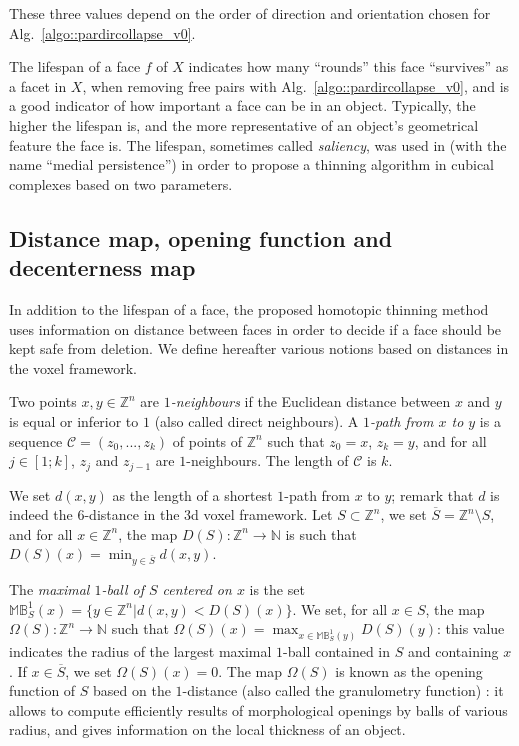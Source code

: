 \documentclass[final,envcountsame]{llncs}
\def\OneBall#1{\mathbb{B}^{1}_{#1}}
\def\MaxOneBall#1{\mathbb{M}\OneBall{#1}}
\def\mydist1{D}
\def\mydd1{\Omega}
\def\dist1{d}
\def\Dist1#1{\mydist1(#1)}
\def\DD1#1{\mydd1(#1)}
\def\myem#1{{\em #1}}
\def\quotes#1{``#1''}
\def\Nset{\mathbb{N}}
\def\Zset{\Z}
\def\Nset{\mathbb{N}}
\def\Z{\mathbb{Z}}
\newcommand{\Compl}[1]{\overline{#1}}
\begin{document}
These three values depend on the order of direction and orientation chosen for Alg.~\ref{algo::pardircollapse_v0}.

The lifespan of a face $f$ of $X$ indicates how many \quotes{rounds} this face \quotes{survives} as a facet in $X$, when removing free pairs with Alg.~\ref{algo::pardircollapse_v0}, and is a good indicator of how important a face can be in an object. Typically, the higher the lifespan is, and the more representative of an object's geometrical feature the face is. The lifespan, sometimes called \myem{saliency}, was used in \cite{Liu2009} (with the name \quotes{medial persistence}) in order to propose a thinning algorithm in cubical complexes based on two parameters.



\subsection{Distance map, opening function and decenterness map}
\label{subsec::distmap}
In addition to the lifespan of a face, the proposed homotopic thinning method uses information on distance between faces in order to decide if a face should be kept safe from deletion. We define hereafter various notions based on distances in the voxel framework.

Two points $x,y \in \Zset^n$ are \myem{$1$-neighbours} if the Euclidean distance between $x$ and $y$ is equal or inferior to $1$ (also called direct neighbours). A \myem{$1$-path from $x$ to $y$} is a sequence $\mathcal{C}=(z_0,...,z_k)$ of points of $\Zset^n$ such that $z_0=x$, $z_k=y$, and for all $j \in [1;k]$, $z_j$ and $z_{j-1}$ are $1$-neighbours. The length of $\mathcal{C}$ is $k$. 

We set $\dist1(x,y)$ as the length of a shortest $1$-path from $x$ to $y$; remark that $\dist1$ is indeed the $6$-distance in the 3d voxel framework. Let $S \subset \Zset^n$, we set $\Compl{S} = \Zset^n \setminus S$, and for all $x \in \Zset^n$, the map $\Dist1{S}: \Zset^n \rightarrow \Nset$ is such that $\Dist1{S}(x) = \displaystyle \min_{y \in \Compl{S}} \dist1(x,y)$. 

The \myem{maximal $1$-ball of $S$ centered on $x$} is the set $\MaxOneBall{S}(x)=\{y \in \Zset^n | \dist1(x,y) < \Dist1{S}(x)\}$.
We set, for all $x \in S$, the map $\DD1{S}: \Zset^n \rightarrow \Nset$ such that $\DD1{S}(x) = \displaystyle \max_{x \in \MaxOneBall{S}(y)} \Dist1{S}(y)$: this value indicates the radius of the largest maximal $1$-ball contained in $S$ and containing $x$. If $x \in \Compl{S}$, we set $\DD1{S}(x) = 0$. The map $\DD1{S}$ is known as the opening function of $S$ based on the $1$-distance (also called the granulometry function) \cite{Matheron67}: it allows to compute efficiently results of morphological openings by balls of various radius, and gives information on the local thickness of an object.
\end{document}
